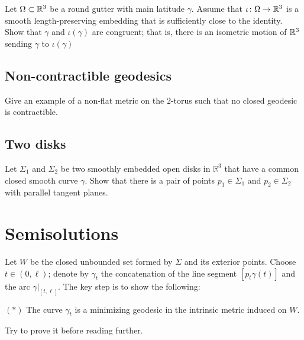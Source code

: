 \begin{pr}
Let $\Omega\subset \mathbb{R}^3$ be a round gutter with main latitude $\gamma$. 
Assume that $\iota\:\Omega\z\to\RR^3$ 
is a smooth length-preserving embedding that is sufficiently close to the identity.
Show that $\gamma$ and $\iota(\gamma)$ are congruent;
that is, there is an isometric motion of $\mathbb{R}^3$ sending $\gamma$ to $\iota(\gamma)$
\end{pr}



\subsection*{Non-contractible geodesics}
\label{torus}

\begin{pr}
Give an example of a non-flat metric 
on the $2$-torus such that no closed geodesic is contractible.
\end{pr}


\subsection*{Two disks}
\label{Two disks}

\begin{pr}
Let $\Sigma_1$ and $\Sigma_2$ be two smoothly embedded open disks in $\mathbb R^3$ 
that have a common closed smooth curve $\gamma$.
Show that there is a pair of points  $p_1\in \Sigma_1$ and $p_2\in \Sigma_2$ with parallel tangent planes.
\end{pr}



\section*{Semisolutions}
Let $W$ be the closed unbounded set formed by $\Sigma$ and its exterior points.
Choose $t\in (0,\ell)$;
denote by $\gamma_t$ the concatenation of the line segment $[p_t\gamma(t)]$ and the arc $\gamma|_{[t,\ell]}$.
The key step is to show the following:

\begin{cl}{$({*})$} The curve $\gamma_t$ is a minimizing geodesic in the intrinsic metric induced on $W$.
\end{cl}


Try to prove it before reading further.

